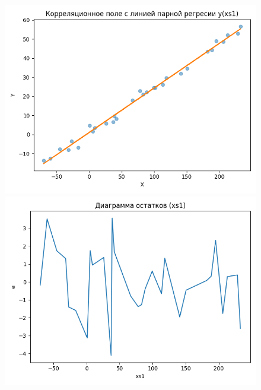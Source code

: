 \begin{figure}[H]
	\begin{minipage}[H]{0.32\linewidth}
		\begin{center}
			\includegraphics[width=\linewidth]{figures/scatter_xs1}
		\end{center}
	\end{minipage}
	\hfill
	\begin{minipage}[H]{0.32\linewidth}
		\begin{center}
			\includegraphics[width=\linewidth]{figures/res_plot_xs1}
		\end{center}
	\end{minipage}
	\hfill
	\begin{minipage}[H]{0.32\linewidth}

\end{minipage}
\end{figure}
